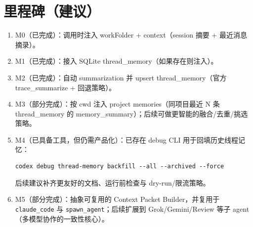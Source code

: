 \documentclass[UTF8,11pt]{ctexart}
\begin{document}
\section{里程碑（建议）}
\begin{enumerate}[nosep]
  \item M0（已完成）：调用时注入 workFolder + context（session 摘要 + 最近消息摘录）。
  \item M1（已完成）：接入 SQLite thread\_memory（如果存在则注入）。
  \item M2（已完成）：自动 summarization 并 upsert thread\_memory（官方 trace\_summarize + 回退策略）。
  \item M3（部分完成）：按 cwd 注入 project memories（同项目最近 N 条 thread\_memory 的 memory\_summary）；后续可做更智能的融合/去重/挑选策略。
  \item M4（已具备工具，但仍需产品化）：已存在 debug CLI 用于回填历史线程记忆：
    \begin{lstlisting}
codex debug thread-memory backfill --all --archived --force
    \end{lstlisting}
    后续建议补齐更友好的文档、运行前检查与 dry-run/限流策略。
  \item M5（部分完成）：抽象可复用的 Context Packet Builder，并复用于 \texttt{claude\_code} 与 \texttt{spawn\_agent}；后续扩展到 Grok/Gemini/Review 等子 agent（多模型协作的一致性核心）。
\end{enumerate}
\end{document}
